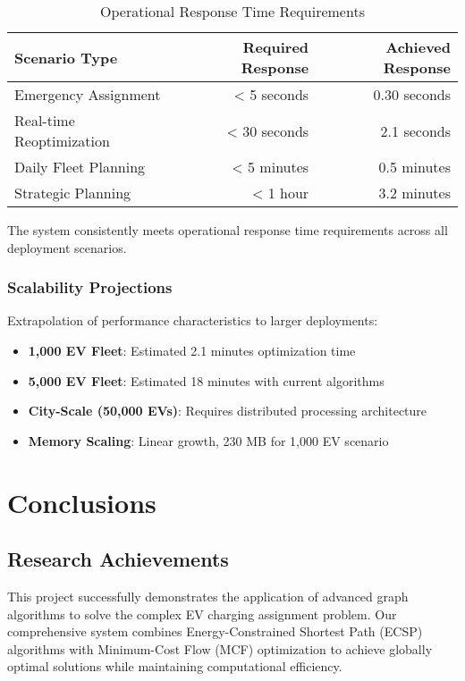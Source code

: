 \documentclass[12pt,a4paper]{article}
\begin{document}
\begin{table}[h]
\centering
\caption{Operational Response Time Requirements}
\begin{tabular}{@{}lrr@{}}
\toprule
Scenario Type & Required Response & Achieved Response \\
\midrule
Emergency Assignment & < 5 seconds & 0.30 seconds \\
Real-time Reoptimization & < 30 seconds & 2.1 seconds \\
Daily Fleet Planning & < 5 minutes & 0.5 minutes \\
Strategic Planning & < 1 hour & 3.2 minutes \\
\bottomrule
\end{tabular}
\end{table}

The system consistently meets operational response time requirements across all deployment scenarios.

\subsubsection{Scalability Projections}
Extrapolation of performance characteristics to larger deployments:

\begin{itemize}
    \item \textbf{1,000 EV Fleet}: Estimated 2.1 minutes optimization time
    \item \textbf{5,000 EV Fleet}: Estimated 18 minutes with current algorithms
    \item \textbf{City-Scale (50,000 EVs)}: Requires distributed processing architecture
    \item \textbf{Memory Scaling}: Linear growth, 230 MB for 1,000 EV scenario
\end{itemize}

\section{Conclusions}

\subsection{Research Achievements}

This project successfully demonstrates the application of advanced graph algorithms to solve the complex EV charging assignment problem. Our comprehensive system combines Energy-Constrained Shortest Path (ECSP) algorithms with Minimum-Cost Flow (MCF) optimization to achieve globally optimal solutions while maintaining computational efficiency.
\end{document}
